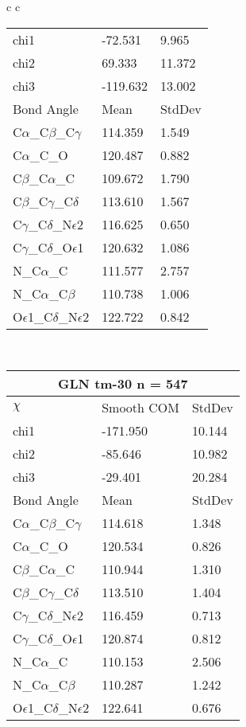 \begin{longtable}{ c c }
\begin{tabular}{ l l l }
  chi1 & -72.531 & 9.965 \\ 
  chi2 & 69.333 & 11.372 \\ 
  chi3 & -119.632 & 13.002 \\ \midrule
  Bond Angle   & Mean     & StdDev \\ \midrule
  C$\alpha$\_C$\beta$\_C$\gamma$ & 114.359 & 1.549\\
  C$\alpha$\_C\_O & 120.487 & 0.882\\
  C$\beta$\_C$\alpha$\_C & 109.672 & 1.790\\
  C$\beta$\_C$\gamma$\_C$\delta$ & 113.610 & 1.567\\
  C$\gamma$\_C$\delta$\_N$\epsilon$2 & 116.625 & 0.650\\
  C$\gamma$\_C$\delta$\_O$\epsilon$1 & 120.632 & 1.086\\
  N\_C$\alpha$\_C & 111.577 & 2.757\\
  N\_C$\alpha$\_C$\beta$ & 110.738 & 1.006\\
  O$\epsilon$1\_C$\delta$\_N$\epsilon$2 & 122.722 & 0.842\\
  \bottomrule
  \end{tabular}
  \\
  \begin{tabular}{ l l l }
  \toprule
  \multicolumn{3}{c}{GLN \textbf{tm-30} n = 547} \\ \toprule
  $\chi$       & Smooth COM & StdDev \\ \midrule
  chi1 & -171.950 & 10.144 \\ 
  chi2 & -85.646 & 10.982 \\ 
  chi3 & -29.401 & 20.284 \\ \midrule
  Bond Angle   & Mean     & StdDev \\ \midrule
  C$\alpha$\_C$\beta$\_C$\gamma$ & 114.618 & 1.348\\
  C$\alpha$\_C\_O & 120.534 & 0.826\\
  C$\beta$\_C$\alpha$\_C & 110.944 & 1.310\\
  C$\beta$\_C$\gamma$\_C$\delta$ & 113.510 & 1.404\\
  C$\gamma$\_C$\delta$\_N$\epsilon$2 & 116.459 & 0.713\\
  C$\gamma$\_C$\delta$\_O$\epsilon$1 & 120.874 & 0.812\\
  N\_C$\alpha$\_C & 110.153 & 2.506\\
  N\_C$\alpha$\_C$\beta$ & 110.287 & 1.242\\
  O$\epsilon$1\_C$\delta$\_N$\epsilon$2 & 122.641 & 0.676\\

\end{tabular}
\end{longtable}
